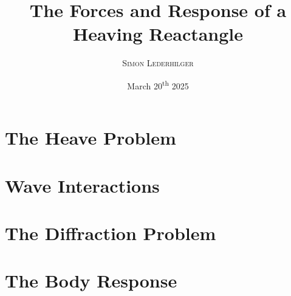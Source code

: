 \documentclass{article}
\title{The Forces and Response of a Heaving Reactangle}
\subtitle{\emph{\headcourse}}
\author{\textsc{Simon Lederhilger}}
\date{March 20\textsuperscript{th} 2025}
\begin{document}
\maketitle\thispagestyle{fancy}
    \begin{multicols*}{2}
        \section[Heave]{The Heave Problem}
        

        \section[Waves]{Wave Interactions}
        

        \section[Diffraction]{The Diffraction Problem}
        

        \section[Response]{The Body Response}
        
    \end{multicols*}
\end{document}
